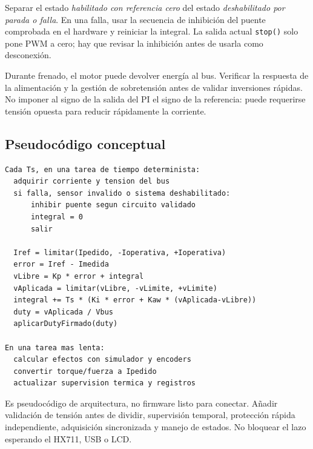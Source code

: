\documentclass[11pt,a4paper]{article}
\begin{document}
Separar el estado \textit{habilitado con referencia cero} del estado \textit{deshabilitado por parada o falla}. En una falla, usar la secuencia de inhibición del puente comprobada en el hardware y reiniciar la integral. La salida actual \texttt{stop()} solo pone PWM a cero; hay que revisar la inhibición antes de usarla como desconexión.

Durante frenado, el motor puede devolver energía al bus. Verificar la respuesta de la alimentación y la gestión de sobretensión antes de validar inversiones rápidas. No imponer al signo de la salida del PI el signo de la referencia: puede requerirse tensión opuesta para reducir rápidamente la corriente.

\subsection{Pseudocódigo conceptual}
\begin{lstlisting}
Cada Ts, en una tarea de tiempo determinista:
  adquirir corriente y tension del bus
  si falla, sensor invalido o sistema deshabilitado:
      inhibir puente segun circuito validado
      integral = 0
      salir

  Iref = limitar(Ipedido, -Ioperativa, +Ioperativa)
  error = Iref - Imedida
  vLibre = Kp * error + integral
  vAplicada = limitar(vLibre, -vLimite, +vLimite)
  integral += Ts * (Ki * error + Kaw * (vAplicada-vLibre))
  duty = vAplicada / Vbus
  aplicarDutyFirmado(duty)

En una tarea mas lenta:
  calcular efectos con simulador y encoders
  convertir torque/fuerza a Ipedido
  actualizar supervision termica y registros
\end{lstlisting}
Es pseudocódigo de arquitectura, no firmware listo para conectar. Añadir validación de tensión antes de dividir, supervisión temporal, protección rápida independiente, adquisición sincronizada y manejo de estados. No bloquear el lazo esperando el HX711, USB o LCD.
\end{document}
